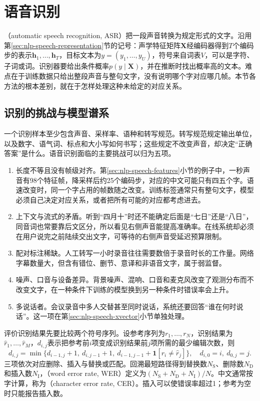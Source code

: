 \section{语音识别}
\label{sec:nlp-speech-recognition}

（automatic speech recognition, ASR）把一段声音转换为规定形式的文字。沿用第\ref{sec:nlp-speech-representation}节的记号：声学特征矩阵$\bm{X}$经编码器得到$T$个编码步的表示$\bm{h}_1,\ldots,\bm{h}_T$，目标文本为$y=(y_1,\ldots,y_U)$，符号来自词表$V$，可以是字符、子词或词。识别器要给出条件概率$p(y\mid\bm{X})$，并在推断时找出概率高的文本。难点在于训练数据只给出整段声音与整句文字，没有说明哪个字对应哪几帧。本节各方法的根本差别，就在于怎样处理这种未给定的对应关系。

\subsection{识别的挑战与模型谱系}
\label{sec:nlp-speech-asr-challenges}

一个识别样本至少包含声音、采样率、语种和转写规范。转写规范规定输出单位，以及数字、语气词、标点和大小写如何书写；这些规定不改变声音，却决定“正确答案”是什么。语音识别面临的主要挑战可以归为五项。

\begin{enumerate}
  \item 长度不等且没有帧级对齐。第\ref{sec:nlp-speech-features}小节的例子中，一秒声音有98个特征帧，降采样后约25个编码步，对应的中文可能只有四五个字。语速改变时，同一个字占用的帧数随之改变。训练标签通常只有整句文字，模型必须自己决定对应关系，或者把所有可能的对应都考虑进去。
  \item 上下文与流式的矛盾。听到“四月十”时还不能确定后面是“七日”还是“八日”，同音词也常要靠后文区分，所以看见右侧声音能提高准确率。在线系统却必须在用户说完之前陆续交出文字，可等待的右侧声音受延迟预算限制。
  \item 配对标注稀缺。人工转写一小时录音往往需要数倍于录音时长的工作量。网络字幕数量大，但含有错位、删节、意译和非语音文字，属于弱监督。
  \item 噪声、口音与设备差异。背景噪声、混响、口音和麦克风改变了观测分布而不改变文字，在一种条件下训练的模型换到另一种条件时错误率会上升。
  \item 多说话者。会议录音中多人交替甚至同时说话，系统还要回答“谁在何时说话”。这一项在第\ref{sec:nlp-speech-xvector}小节单独处理。
\end{enumerate}

评价识别结果先要比较两个符号序列。设参考序列为$r_1,\ldots,r_N$，识别结果为$\hat r_1,\ldots,\hat r_M$，$d_{i,j}$表示把参考前$i$项变成识别结果前$j$项所需的最少编辑次数，则
\begin{equation}
 d_{i,j}=\min\{d_{i-1,j}+1,\ d_{i,j-1}+1,\
              d_{i-1,j-1}+\mathbf{1}[r_i\ne\hat r_j]\},
 \quad d_{i,0}=i,\ d_{0,j}=j.
 \label{eq:nlp-speech-edit-distance}
\end{equation}
三项依次对应删除、插入与替换或匹配。回溯最短路径得到替换数$N_{\mathrm{S}}$、删除数$N_{\mathrm{D}}$和插入数$N_{\mathrm{I}}$，（word error rate, WER）定义为$(N_{\mathrm{S}}+N_{\mathrm{D}}+N_{\mathrm{I}})/N$。中文通常按字计算，称为（character error rate, CER）。插入可以使错误率超过1；参考为空时只能报告插入数。

